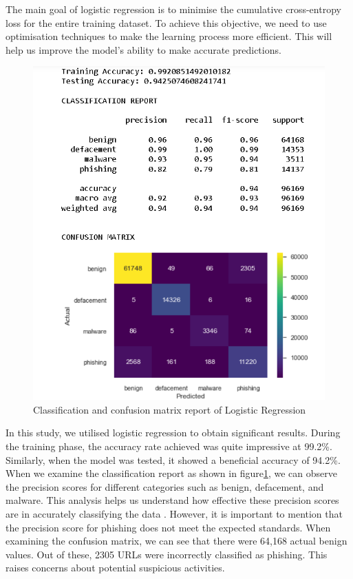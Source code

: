 The main goal of logistic regression is to minimise the cumulative cross-entropy loss for the entire training dataset. To achieve this objective, we need to use optimisation techniques to make the learning process more efficient. This will help us improve the model's ability to make accurate predictions.





\begin{figure}[hb]
\centering
\centerline{\includegraphics[width=1\textwidth]{LogisticRegressionreport.png}}
\caption{Classification and confusion matrix report of Logistic Regression}
\label{Claaification Report of LR }
\end{figure}







In this study, we utilised logistic regression to obtain significant results. During the training phase, the accuracy rate achieved was quite impressive at 99.2\%. Similarly, when the model was tested, it showed a beneficial accuracy of 94.2\%. When we examine the classification report as shown in figure\ref{Claaification Report of LR }, we can observe the precision scores for different categories such as benign, defacement, and malware. This analysis helps us understand how effective these precision scores are in accurately classifying the data . However, it is important to mention that the precision score for phishing does not meet the expected standards. When examining the confusion matrix, we can see that there were 64,168 actual benign values. Out of these, 2305 URLs were incorrectly classified as phishing. This raises concerns about potential suspicious activities.

